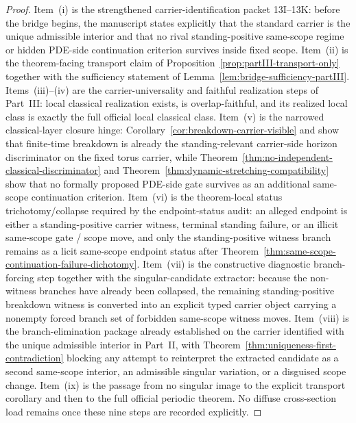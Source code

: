 \begin{proof}
Item~(i) is the strengthened carrier-identification packet 13I--13K: before the bridge begins, the manuscript states explicitly that the standard carrier is the unique admissible interior and that no rival standing-positive same-scope regime or hidden PDE-side continuation criterion survives inside fixed scope. Item~(ii) is the theorem-facing transport claim of Proposition~\ref{prop:partIII-transport-only} together with the sufficiency statement of Lemma~\ref{lem:bridge-sufficiency-partIII}. Items~(iii)--(iv) are the carrier-universality and faithful realization steps of Part~III: local classical realization exists, is overlap-faithful, and its realized local class is exactly the full official local classical class. Item~(v) is the narrowed classical-layer closure hinge: Corollary~\ref{cor:breakdown-carrier-visible} and \HorizonDetectabilityRef{} show that finite-time breakdown is already the standing-relevant carrier-side horizon discriminator on the fixed torus carrier, while Theorem~\ref{thm:no-independent-classical-discriminator} and Theorem~\ref{thm:dynamic-stretching-compatibility} show that no formally proposed PDE-side gate survives as an additional same-scope continuation criterion. Item~(vi) is the theorem-local status trichotomy/collapse required by the endpoint-status audit: an alleged endpoint is either a standing-positive carrier witness, terminal standing failure, or an illicit same-scope gate / scope move, and only the standing-positive witness branch remains as a licit same-scope endpoint status after Theorem~\ref{thm:same-scope-continuation-failure-dichotomy}. Item~(vii) is the constructive diagnostic branch-forcing step together with the singular-candidate extractor: because the non-witness branches have already been collapsed, the remaining standing-positive breakdown witness is converted into an explicit typed carrier object carrying a nonempty forced branch set of forbidden same-scope witness moves. Item~(viii) is the branch-elimination package already established on the carrier identified with the unique admissible interior in Part~II, with Theorem~\ref{thm:uniqueness-first-contradiction} blocking any attempt to reinterpret the extracted candidate as a second same-scope interior, an admissible singular variation, or a disguised scope change. Item~(ix) is the passage from no singular image to the explicit transport corollary and then to the full official periodic theorem. No diffuse cross-section load remains once these nine steps are recorded explicitly.
\end{proof}

